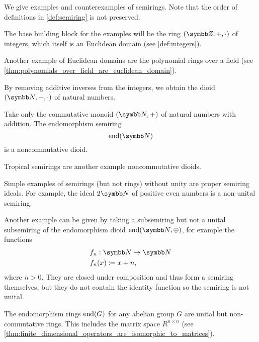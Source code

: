 \begin{example}\label{ex:semirings}
  We give examples and counterexamples of semirings. Note that the order of definitions in \cref{def:semiring} is not preserved.

  \begin{description}
     The base building block for the examples will be the ring \( (\Z, +, \cdot) \) of integers, which itself is an Euclidean domain (see \cref{def:integers}).

    Another example of Euclidean domains are the polynomial rings over a field (see \cref{thm:polynomials_over_field_are_euclidean_domain}).

     By removing additive inverses from the integers, we obtain the dioid \( (\BB{N}, +, \cdot) \) of natural numbers.

    Take only the commutative monoid \( (\BB{N}, +) \) of natural numbers with addition. The endomorphism semiring
    \begin{equation*}
      \End(\BB{N})
    \end{equation*}
    is a noncommutative dioid.

    Tropical semirings are another example noncommutative dioids.

     Simple examples of semirings (but not rings) without unity are proper semiring ideals. For example, the ideal \( 2\BB{N} \) of positive even numbers is a non-unital semiring.

    Another example can be given by taking a subsemiring but not a unital subsemiring of the endomorphism dioid \( \End(\BB{N}, \oplus) \), for example the functions
    \begin{align*}
      &f_n: \BB{N} \to \BB{N} \\
      &f_n(x) \coloneqq x + n,
    \end{align*}
    where \( n > 0 \). They are closed under composition and thus form a semiring themselves, but they do not contain the identity function so the semiring is not unital.

     The endomorphism rings \( \operatorname{end}(G) \) for any abelian group \( G \) are unital but non-commutative rings. This includes the matrix space \( R^{n \times n} \) (see \cref{thm:finite_dimensional_operators_are_isomorphic_to_matrices}).


\end{description}
\end{example}

